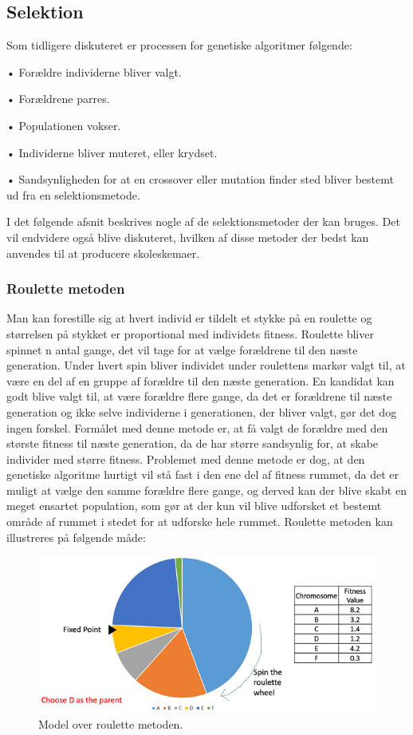 \subsection{Selektion}
Som tidligere diskuteret er processen for genetiske algoritmer følgende:

•	Forældre individerne bliver valgt.

•	Forældrene parres.

•	Populationen vokser.

•	Individerne bliver muteret, eller krydset.

•	Sandsynligheden for at en crossover eller mutation finder sted bliver bestemt ud fra en selektionsmetode.

I det følgende afsnit beskrives nogle af de selektionsmetoder der kan bruges. Det vil endvidere også blive diskuteret, hvilken af disse metoder der bedst kan anvendes til at producere skoleskemaer\cite{winston2014}.

\subsubsection{Roulette metoden}

Man kan forestille sig at hvert individ er tildelt et stykke på en roulette og størrelsen på stykket er proportional med individets fitness. Roulette bliver spinnet n antal gange, det vil tage for at vælge forældrene til den næste generation. Under hvert spin bliver individet under roulettens markør valgt til, at være en del af en gruppe af forældre til den næste generation. En kandidat kan godt blive valgt til, at være forældre flere gange, da det er forældrene til næste generation og ikke selve individerne i generationen, der bliver valgt, gør det dog ingen forskel. Formålet med denne metode er, at få valgt de forældre med den største fitness til næste generation, da de har større sandsynlig for, at skabe individer med større fitness. Problemet med denne metode er dog, at den genetiske algoritme hurtigt vil stå fast i den ene del af fitness rummet, da det er muligt at vælge den samme forældre flere gange, og derved kan der blive skabt en meget ensartet population, som gør at der kun vil blive udforsket et bestemt område af rummet i stedet for at udforske hele rummet\cite{jebari2013}\cite{selection}.
Roulette metoden kan illustreres på følgende måde:
\begin{figure}[!h]
  \centering
  \includegraphics[width=\textwidth]{partials/graphics/roulette.png}
  \caption{Model over roulette metoden\cite{roulette}.}
  \label{fig:roulette}
\end{figure}

